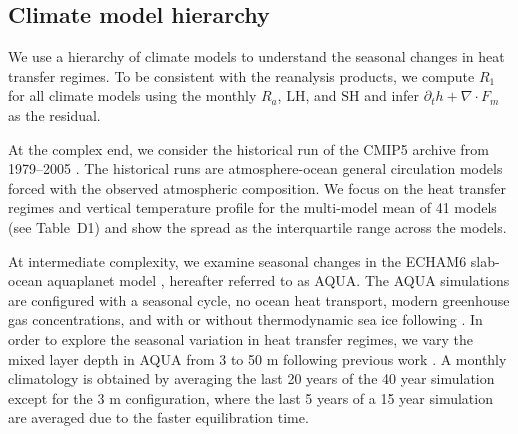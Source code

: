 \documentclass{ametsocV5}
\begin{document}
    \subsection{Climate model hierarchy}\label{subsec:models}
    We use a hierarchy of climate models to understand the seasonal changes in heat transfer regimes. To be consistent with the reanalysis products, we compute $R_1$ for all climate models using the monthly $R_a$, $\mathrm{LH}$, and $\mathrm{SH}$ and infer $\partial_t h + \nabla\cdot F_m $ as the residual.
    
    At the complex end, we consider the historical run of the CMIP5 archive from 1979--2005 \citep{taylor2012}. The historical runs are atmosphere-ocean general circulation models forced with the observed atmospheric composition. We focus on the heat transfer regimes and vertical temperature profile for the multi-model mean of 41 models (see Table~D1) and show the spread as the interquartile range across the models.
    
    At intermediate complexity, we examine seasonal changes in the ECHAM6 slab-ocean aquaplanet model \citep{stevens2013}, hereafter referred to as AQUA. The AQUA simulations are configured with a seasonal cycle, no ocean heat transport, modern greenhouse gas concentrations, and with or without thermodynamic sea ice following \cite{shaw2020}. In order to explore the seasonal variation in heat transfer regimes, we vary the mixed layer depth in AQUA from 3 to 50 m following previous work \citep{donohoe2013, barpanda2020}. A monthly climatology is obtained by averaging the last 20 years of the 40 year simulation except for the 3 m configuration, where the last 5 years of a 15 year simulation are averaged due to the faster equilibration time.
    
\end{document}
